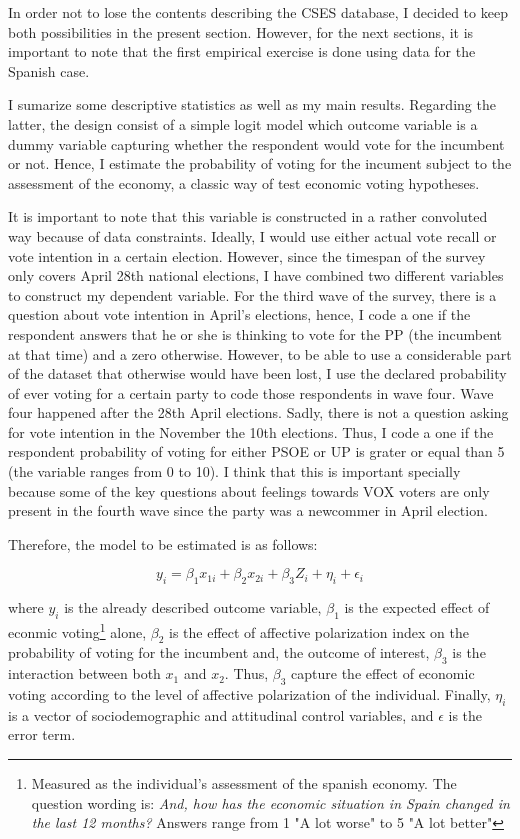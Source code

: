 \documentclass[a4paper, svgnames]{article}
\begin{document}
In order not to lose the contents describing the CSES database, I decided to keep both possibilities in the present section. However, for the next sections, it is important to note that the first empirical exercise is done using \citep*{Torcal2020} data for the Spanish case.

I sumarize some descriptive statistics as well as my main results. Regarding the latter, the design consist of a simple logit model which outcome variable is a dummy variable capturing whether the respondent would vote for the incumbent or not. Hence, I estimate the probability of voting for the incument subject to the assessment of the economy, a classic way of test economic voting hypotheses.

It is important to note that this variable is constructed in a rather convoluted way because of data constraints. Ideally, I would use either actual vote recall or vote intention in a certain election. However, since the timespan of the survey only covers April 28th national elections, I have combined two different variables to construct my dependent variable. For the third wave of the survey, there is a question about vote intention in April's elections, hence, I code a one if the respondent answers that he or she is thinking to vote for the PP (the incumbent at that time) and a zero otherwise. However, to be able to use a considerable part of the dataset that otherwise would have been lost, I use the declared probability of ever voting for a certain party to code those respondents in wave four. Wave four happened after the 28th April elections. Sadly, there is not a question asking for vote intention in the November the 10th elections. Thus, I code a one if the respondent probability of voting for either PSOE or UP is grater or equal than 5 (the variable ranges from 0 to 10). I think that this is important specially because some of the key questions about feelings towards VOX voters are only present in the fourth wave since the party was a newcommer in April election.

Therefore, the model to be estimated is as follows:

\begin{equation}
	\label{model}
	y_i = \beta_1 x_{1i} + \beta_2 x_{2i} + \beta_3 Z_i  + \eta_i  + \epsilon_i
\end{equation}

where $y_i$ is the already described outcome variable, $\beta_1$ is the expected effect of econmic voting\footnote{Measured as the individual's assessment of the spanish economy. The question wording is: \textit{And, how has the economic situation in Spain changed in the last 12 months?} Answers range from 1 "A lot worse" to 5 "A lot better"} alone, $\beta_2$ is the effect of affective polarization index on the probability of voting for the incumbent and, the outcome of interest, $\beta_3$ is the interaction between both $x_1$ and $x_2$. Thus, $\beta_3$ capture the effect of economic voting according to the level of affective polarization of the individual. Finally, $\eta_i$ is a vector of sociodemographic and attitudinal control variables, and $\epsilon$ is the error term.
\end{document}

